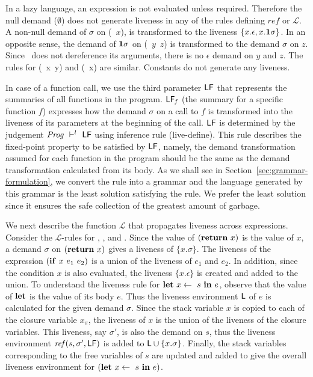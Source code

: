 \documentclass[9pt]{sigplanconf}
\begin{document}
In  a   lazy  language,   an  expression   is  not   evaluated  unless
required. Therefore  the null  demand ($\emptyset$) does  not generate
liveness in any of the rules defining $\mathit{ref}$ or $\mathcal{L}$.
A non-null  demand of  $\sigma$ on (\CDR~$x$),  is transformed  to the
liveness $\{x.\epsilon,  x.\mathbf{1}\sigma\}$.  In an opposite  sense, the
demand  of  $\mathbf{1}\sigma$ on  (\CONS~$y$~$z$)  is  transformed to  the
demand  $\sigma$  on  $z$.   Since \CONS\  does  not  dereference  its
arguments, there  is no $\epsilon$ demand  on $y$ and $z$.   The rules
for (\PRIM~x~y) and (\NULLQ~x) are  similar. Constants do not generate
any liveness.



In case of a  function call, we  use the third  parameter $\mathsf{LF}$
that  represents  the  summaries  of all  functions  in  the  program.
$\mathsf{LF}_{\mathit  f}$  (the summary for a  specific
function $f$) expresses  how the demand $\sigma$ on a  call to $f$ is
transformed into  the liveness of  its parameters at the  beginning of
the  call.  $\mathsf{LF}$  is determined  by the  judgement $\mathit{Prog}
\ \vdash^l\   \mathsf{LF}$ using  inference rule  ({\sc live-define}).   This rule
describes  the  fixed-point property  to  be  satisfied by  $\mathsf{LF}$,
namely, the  demand transformation  assumed for  each function  in the
program should  be the  same as  the demand  transformation calculated
from      its      body.       As       we      shall      see      in
Section~\ref{sec:grammar-formulation},  we  convert  the rule  into  a
grammar and  the language generated  by this grammar is  the least
solution satisfying  the rule. We  prefer the least solution  since it
ensures the safe collection of the greatest amount of garbage.

We next  describe the function $\mathcal{L}$  that propagates liveness
across  expressions.   Consider  the $\mathcal{L}$-rules  for  {\LET},
{\SIF}, and {\SRETURN}.  Since the value of $(\mbox{$\mathbf{ return}$}~x)$ is the
value  of  $x$,  a  demand $\sigma$  on  $(\mbox{$\mathbf{ return}$}~x)$  gives  a
liveness   of  $\{x.\sigma\}$.    The  liveness   of  the   expression
$(\mbox{$\mathbf{ if}$}~x~e_1~e_2)$  is  a union  of  the  liveness of  $e_1$  and
$e_2$. In  addition, since  the condition $x$  is also  evaluated, the
liveness $\{x.\epsilon\}$ is created and  added to the union.  
To  understand  the  liveness rule  for  $\mbox{$\mathbf{ let}$}~x  \leftarrow~s~\mbox{$\mathbf{ in}$}~e$,
observe that the value  of $\mbox{$\mathbf{ let}$}$ is the value of  its body $e$.  Thus
the  liveness environment  $\mathsf{L}$ of  $e$ is  calculated for  the given
demand $\sigma$. Since the stack variable $x$ is copied to each of the
closure variable  $x_{\pi}$, the liveness of  $x$ is the union  of the
liveness of the  closure variables.  This liveness,  say $\sigma'$, is
also  the  demand  on  $s$, thus the  liveness  environment
$\mathit{ref}(s,   \sigma',   \mathsf{LF})$   is  added   to   $\mathsf{L}   \cup
\{x.\sigma\}$. Finally, the stack variables corresponding to the free
variables of $s$ are updated and added 
  to  give the  overall liveness environment  for $(\mbox{$\mathbf{ let}$}~x
\leftarrow~s~\mbox{$\mathbf{ in}$}~e)$.
\end{document}
